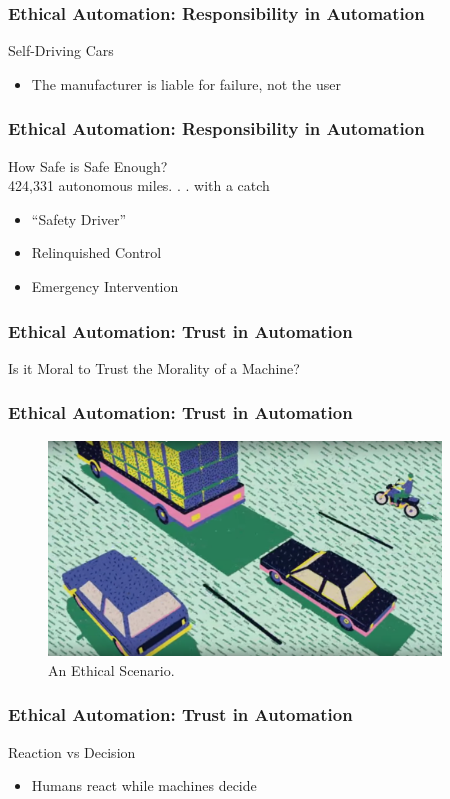 \begin{frame}
	\frametitle{ Ethical Automation: Responsibility in Automation}
	{\Large Self-Driving Cars}
	\begin{itemize}
		\item The manufacturer is liable for failure, not the user
	\end{itemize}
\end{frame}


\begin{frame}
	\frametitle{ Ethical Automation: Responsibility in Automation}
	{\Large How Safe is Safe Enough?}\\
	424,331 autonomous miles. . . with a catch
	\begin{itemize}
		\item ``Safety Driver''
		\item Relinquished Control
		\item Emergency Intervention
	\end{itemize}
\end{frame}


\begin{frame}
	\frametitle{ Ethical Automation: Trust in Automation}
	\Large{Is it Moral to Trust the Morality of a Machine?}
\end{frame}


\begin{frame}
	\frametitle{ Ethical Automation: Trust in Automation}
	\begin{figure}[bht]
		\centering
		\includegraphics[width=4.1in]{diagrams/image00}
		\caption{An Ethical Scenario.}
		\label{fig:-deg}
	\end{figure}
\end{frame}


\begin{frame}
	\frametitle{ Ethical Automation: Trust in Automation}
	{\Large Reaction vs Decision}
	\begin{itemize}
		\item Humans react while machines decide
	\end{itemize}
\end{frame}


